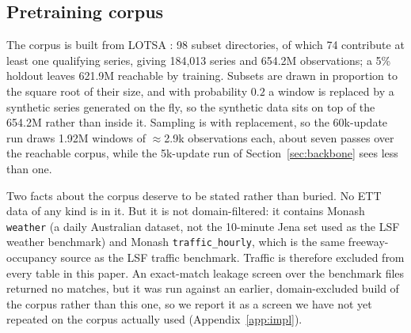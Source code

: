 \subsection{Pretraining corpus}
\label{sec:corpus}

The corpus is built from LOTSA \citep{moirai}: 98 subset directories, of which 74 contribute at
least one qualifying series, giving 184{,}013 series and 654.2M observations; a 5\% holdout leaves
621.9M reachable by training. Subsets are drawn in proportion to the square root of their size, and
with probability $0.2$ a window is replaced by a synthetic series generated on the fly, so the
synthetic data sits on top of the 654.2M rather than inside it. Sampling is with replacement, so the
60k-update run draws 1.92M windows of $\approx$2.9k observations each, about seven passes over the
reachable corpus, while the 5k-update run of Section~\ref{sec:backbone} sees less than one.

Two facts about the corpus deserve to be stated rather than buried. No ETT data of any kind is in it.
But it is not domain-filtered: it contains Monash \texttt{weather} (a daily Australian dataset, not
the 10-minute Jena set used as the LSF weather benchmark) and Monash \texttt{traffic\_hourly}, which
is the same freeway-occupancy source as the LSF traffic benchmark. Traffic is therefore excluded from
every table in this paper. An exact-match leakage screen over the benchmark files returned no
matches, but it was run against an earlier, domain-excluded build of the corpus rather than this one,
so we report it as a screen we have not yet repeated on the corpus actually used
(Appendix~\ref{app:impl}).
